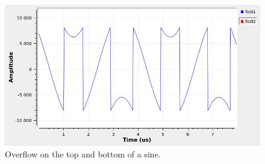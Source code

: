 \documentclass[12pt,oneside]{article}
\begin{document}
\begin{figure}[h!tb]
\begin{center}
\includegraphics[width=0.5\linewidth]{figures/overflow.jpg}
\caption{Overflow on the top and bottom of a sine.}
\label{fig:overflow}
\end{center}
\end{figure}

\newpage 
\vspace*{-1.5cm}
\hspace*{-1cm}
\end{document}
